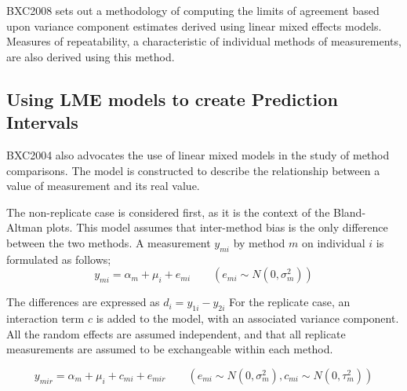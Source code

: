 \documentclass[compress]{beamer}        %
\begin{document}











\begin{frame}
\alert{BXC2008} sets out a methodology of computing the limits of
agreement based upon variance component estimates derived using
linear mixed effects models. Measures of repeatability, a
characteristic of individual methods of measurements, are also
derived using this method.
\end{frame}
\subsection{Using LME models to create Prediction Intervals}

\begin{frame}
\alert{BXC2004} also advocates the use of linear mixed models in
the study of method comparisons. The model is constructed to
describe the relationship between a value of measurement and its
real value. 

The non-replicate case is considered first, as it is
the context of the Bland-Altman plots. This model assumes that
inter-method bias is the only difference between the two methods.
A measurement $y_{mi}$ by method $m$ on individual $i$ is
formulated as follows;
\begin{equation}
y_{mi}  = \alpha_{m} + \mu_{i} + e_{mi} \qquad ( e_{mi} \sim
N(0,\sigma^{2}_{m}))
\end{equation}
\end{frame}
\begin{frame}
The differences are expressed as $d_{i} = y_{1i} - y_{2i}$ For the
replicate case, an interaction term $c$ is added to the model,
with an associated variance component. All the random effects are
assumed independent, and that all replicate measurements are
assumed to be exchangeable within each method.

\begin{equation}
y_{mir}  = \alpha_{m} + \mu_{i} + c_{mi} + e_{mir} \qquad ( e_{mi}
\sim N(0,\sigma^{2}_{m}), c_{mi} \sim N(0,\tau^{2}_{m}))
\end{equation}

\end{frame}
\end{document}
